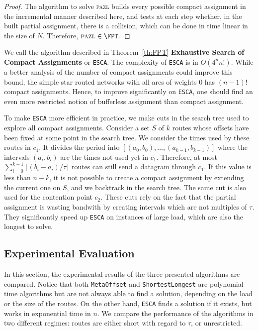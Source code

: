 \documentclass[a4paper,10pt]{journal}
\newcommand\shortestlongest{\texttt{ShortestLongest}\xspace}
\newcommand\metaoffset{\texttt{MetaOffset}\xspace}
\newcommand\ESCA{\texttt{ESCA}\xspace}
\newcommand\pazl{\textsc{pazl}\xspace}
\begin{document}
\begin{proof}
The algorithm to solve \pazl builds every possible compact assignment in the incremental manner described here, and tests at each step whether, in the built partial assignment, there is a collision, which can be done in time linear in the size of $N$. Therefore, $\pazl \in \FPT$.
\end{proof}


We call the algorithm described in Theorem~\ref{th:FPT} \textbf{Exhaustive Search of Compact Assignments}
or \ESCA. The complexity of \ESCA is in $O(4^n n!)$. While a better analysis
of the number of compact assignments could improve this bound, the simple star routed networks with all arcs of weights $0$ has $(n-1)!$ compact assignments. Hence, to improve significantly on \ESCA, one should find an even more restricted notion of bufferless assignment than compact assignment.

To make \ESCA more efficient in practice, we make cuts in the search tree used to explore all compact assignments. Consider a set $S$ of $k$ routes whose offsets have been fixed at some point in the search tree. We consider the times used by these routes in $c_1$. It divides the period into $[(a_0,b_0), \dots, (a_{k-1},b_{k-1})]$ where the intervals $(a_i,b_i)$ are the times not used yet in $c_1$. Therefore, at most $\displaystyle{ \sum_{i=0}^{k-1} \lfloor(b_{i} -a_i)/\tau\rfloor}$ routes can still send a datagram through $c_1$. If this value is less than $n - k$, it is not possible to create a compact assignment by extending the current one on $S$, and we backtrack in the search tree. The same cut is also used for the contention point $c_2$. These cuts rely on the fact that the partial assignment is wasting bandwith by creating intervals which are not multiples of $\tau$. They significantly speed up \ESCA on instances of large load, which are also the longest to solve.



   \subsection{Experimental Evaluation}\label{sec:exp_PAZL}

   
  In this section, the experimental results of the three presented algorithms are compared.
   Notice that both \metaoffset and \shortestlongest are polynomial time algorithms but are not always able to find a solution, depending on the load or the size of the routes. On the other hand, \ESCA finds a solution if it exists, but works in exponential time in $n$. We compare the performance of the algorithms in two different regimes: routes are either short with regard to $\tau$, or unrestricted.
\end{document}
